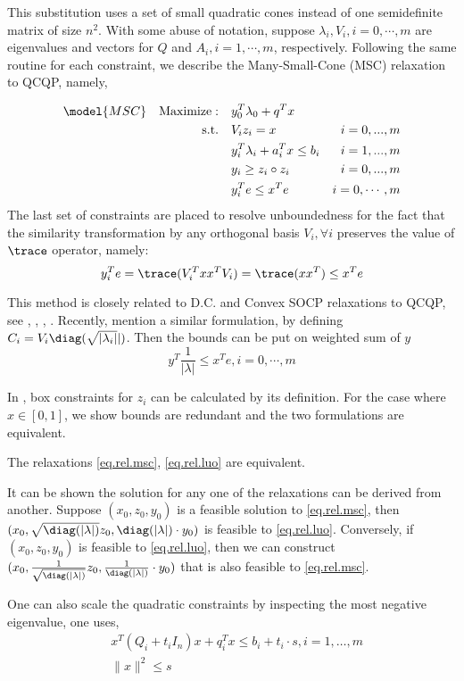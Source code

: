 \documentclass[../main]{subfiles}
\begin{document}
This substitution uses a set of small quadratic cones instead of one semidefinite matrix of size \(n^2\). With some abuse of notation, suppose \(\lambda_i, V_i, i = 0, \cdots, m\) are eigenvalues and vectors for \(Q\) and \(A_i, i = 1,
\cdots, m\), respectively. Following the same routine for each constraint, we describe the Many-Small-Cone (MSC) relaxation to QCQP, namely,

\begin{equation}\label{eq.rel.msc}
  \begin{aligned}
    \model{MSC} \quad \mathrm{Maximize: }\quad & y_0 ^T\lambda_0 + q^Tx                              \\
    \mathrm{s.t.} \quad                        & V_i z_i = x                        & i=0,...,m      \\
                                               & y_i ^T\lambda_i  + a_i^Tx  \le b_i & i=1,...,m      \\
                                               & y_i \ge z_i \circ z_i              & i=0,...,m      \\
                                               & y_i^Te \le x^Te                    & i=0, \cdots, m
  \end{aligned}
\end{equation}
The last set of constraints are placed to resolve unboundedness for the fact that the similarity transformation by any orthogonal basis \(V_i, \forall i\) preserves the value of \(\trace\) operator, namely:
\begin{equation}
  y_i^Te = \trace( V_i^Txx^T V_i) = \trace (xx^T) \le x^Te
\end{equation}

This method is closely related to D.C. and Convex SOCP relaxations to QCQP, see \cite{zheng_convex_2011}, \cite{zheng_nonconvex_2011}, \cite{jiang_simultaneous_2016}, \cite{ye_new_2003}. Recently, \cite{luo_new_2019} mention a similar formulation, by defining \(C_i = V_i\diag(\sqrt{|\lambda_i|}|)\). Then the bounds can be put on weighted sum of \(y\)
\begin{equation} \label{eq.rel.luo} y^T\frac{1}{|\lambda|}  \le x^Te, i=0, \cdots, m
\end{equation}


In \cite{luo_new_2019}, box constraints for \(z_i\) can be calculated by its definition. For the case where \(x\in [0, 1]\), we show bounds are redundant and the two formulations are equivalent.

\begin{proposition}
  The relaxations \eqref{eq.rel.msc}, \eqref{eq.rel.luo} are equivalent.
\end{proposition}
It can be shown the solution for any one of the relaxations can be derived from another.  Suppose $(x_0, z_0, y_0)$ is a feasible solution to \eqref{eq.rel.msc}, then $(x_0, \sqrt{\diag(|\lambda|)} z_0, \diag(|\lambda|) \cdot y_0)$ is feasible to \eqref{eq.rel.luo}. Conversely, if $(x_0, z_0, y_0)$ is feasible to \eqref{eq.rel.luo}, then we can construct $(x_0, \frac{1}{\sqrt{\diag(|\lambda|)}} z_0, \frac{1}{\diag(|\lambda|)}\cdot y_0)$ that is also feasible to \eqref{eq.rel.msc}.

One can also scale the quadratic constraints by inspecting the most negative eigenvalue, one uses,
\begin{align*}
   & x^T(Q_i+t_i I_n) x+q_i^T x \leqslant b_i+ t_i \cdot s,i= 1,\dots, m \\
   & \|x\|^2 \le s
\end{align*}
\end{document}
